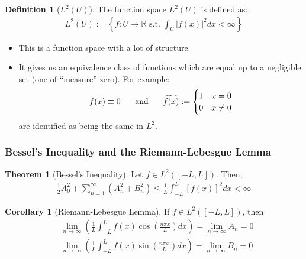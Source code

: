 \documentclass[11pt]{scrartcl}
\theoremstyle{definition}
\newtheorem{theorem}{Theorem}
\newtheorem{corollary}{Corollary}
\newtheorem{definition}{Definition}
\theoremstyle{remark}
\newcommand{\idx}[2]{\int_{#1}^{#2}}
\newcommand{\R}[0]{\mathbb{R}}
\begin{document}
\begin{definition}[$L^2(U)$]
	The function space $L^2(U)$ is defined as: 
	\begin{align}
		L^2(U) := \left\{ f: U \rightarrow \R \text{ s.t. } \idx{U}{} |f(x)|^2 dx < \infty \right\} 	
	\end{align}
	\begin{itemize}[noitemsep]
		\item This is a function space with a lot of structure. 
		\item It gives us an equivalence class of functions which are equal up to a negligible set (one of ``measure'' zero). For example:
		\begin{align*}
			f(x) \equiv 0 \hspace{0.5cm} \text{ and } \hspace{0.5cm} \widetilde{f(x)} := \begin{cases}
				1 & x = 0 \\
				0 & x \neq 0 
			\end{cases}
		\end{align*}
		are identified as being the same in $L^2$.
	\end{itemize}
\end{definition}

\subsubsection{Bessel's Inequality and the Riemann-Lebesgue Lemma}

\begin{theorem}[Bessel's Inequality]
	Let $f \in L^2([-L, L])$. Then, 
	\begin{align}
		\frac{1}{2} A_0^2 + \sum_{n=1}^\infty (A_n^2 + B_n^2) \leq \frac{1}{L} \idx{-L}{L} [f(x)]^2 dx < \infty 	
	\end{align}
\end{theorem}

\begin{corollary}[Riemann-Lebesgue Lemma]
	If $f \in L^2([-L,L])$, then
	\begin{align}
		& \lim_{n \rightarrow \infty} \left( \frac{1}{L} \idx{-L}{L} f(x) \cos \left( \frac{n \pi x}{L} \right) dx \right) = \lim_{n \rightarrow \infty} A_n = 0  \\
		& \lim_{n \rightarrow \infty} \left( \frac{1}{L} \idx{-L}{L} f(x) \sin \left( \frac{n \pi x}{L} \right) dx \right) = \lim_{n \rightarrow \infty} B_n = 0 	
	\end{align}
\end{corollary}
\end{document}
